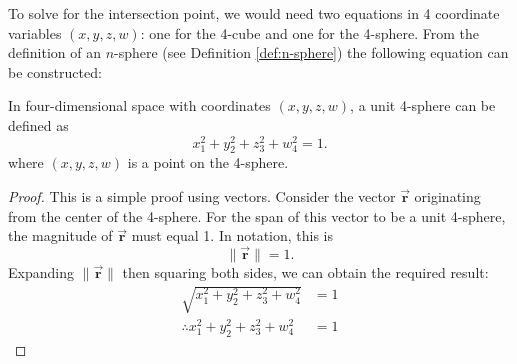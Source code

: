 To solve for the intersection point, we would need two equations in 4 coordinate variables $(x, y, z, w)$: one for the 4-cube and one for the 4-sphere. From the definition of an $n$-sphere (see Definition \ref{def:n-sphere}) the following equation can be constructed:
\begin{lemma}
In four-dimensional space with coordinates $(x, y, z, w)$, a unit 4-sphere can be defined as
\begin{equation}\label{eq:unit 4-sphere}
    x_1^2+y_2^2+z_3^2+w_4^2=1.
\end{equation}
where $(x, y, z, w)$ is a point on the 4-sphere.
\end{lemma}
\begin{proof}
    This is a simple proof using vectors. Consider the vector $\Vec{\mathbf{r}}$ originating from the center of the 4-sphere. For the span of this vector to be a unit 4-sphere, the magnitude of $\Vec{\mathbf{r}}$ must equal 1. In notation, this is $$\lVert\Vec{\mathbf{r}}\rVert = 1.$$
    Expanding $\lVert\Vec{\mathbf{r}}\rVert$ then squaring both sides, we can obtain the required result:
    \begin{align*}
        \sqrt{x_1^2+y_2^2+z_3^2+w_4^2}&=1\\
        \therefore x_1^2+y_2^2+z_3^2+w_4^2&=1
    \end{align*}
\end{proof}

